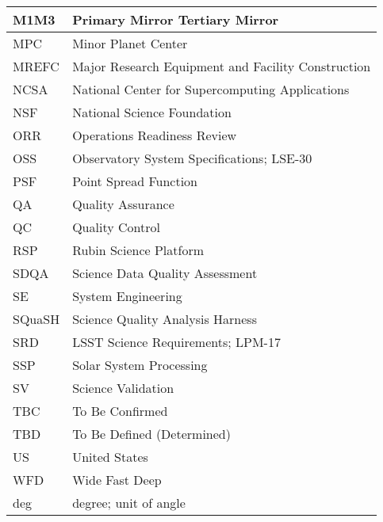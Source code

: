 \begin{longtable}{p{}p{}}
M1M3 & Primary Mirror Tertiary Mirror \\\hline
MPC & Minor Planet Center \\\hline
MREFC & Major Research Equipment and Facility Construction \\\hline
NCSA & National Center for Supercomputing Applications \\\hline
NSF & National Science Foundation \\\hline
ORR & Operations Readiness Review \\\hline
OSS & Observatory System Specifications; LSE-30 \\\hline
PSF & Point Spread Function \\\hline
QA & Quality Assurance \\\hline
QC & Quality Control \\\hline
RSP & Rubin Science Platform \\\hline
SDQA & Science Data Quality Assessment \\\hline
SE & System Engineering \\\hline
SQuaSH & Science Quality Analysis Harness \\\hline
SRD & LSST Science Requirements; LPM-17 \\\hline
SSP & Solar System Processing \\\hline
SV & Science Validation \\\hline
TBC & To Be Confirmed \\\hline
TBD & To Be Defined (Determined) \\\hline
US & United States \\\hline
WFD & Wide Fast Deep \\\hline
deg & degree; unit of angle \\\hline
\end{longtable}
